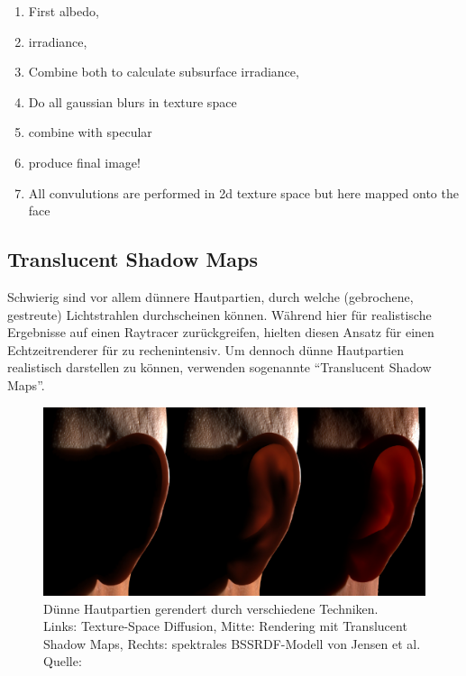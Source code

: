 \documentclass[ngerman,runningheads,a4paper]{llncs}[2018/03/10]
\begin{document}
\begin{enumerate}
  \item First albedo,
  \item irradiance,
  \item Combine both to calculate subsurface irradiance,
  \item Do all gaussian blurs in texture space
  \item combine with specular
  \item produce final image!
  \item All convulutions are performed in 2d texture space but here mapped onto the face
\end{enumerate}

\subsection{Translucent Shadow Maps}
\label{sub:translucent-shadow-maps}

Schwierig sind vor allem dünnere Hautpartien, durch welche (gebrochene, gestreute) Lichtstrahlen durchscheinen können.
Während \citet{realistic-human-face-rendering-matrix} hier für realistische Ergebnisse auf einen Raytracer zurückgreifen, hielten \citet{efficient-human-skin-rendering} diesen Ansatz für einen Echtzeitrenderer für zu rechenintensiv.
Um dennoch dünne Hautpartien realistisch darstellen zu können, verwenden \citet{realistic-human-face-rendering-matrix} sogenannte \enquote{Translucent Shadow Maps}.

\begin{figure}
  \includegraphics[scale=0.2,keepaspectratio]{./images/translucent-shadow-maps.jpg}
  \caption{
    Dünne Hautpartien gerendert durch verschiedene Techniken.\\\hspace{\textwidth}
    Links: Texture-Space Diffusion, Mitte: Rendering mit Translucent Shadow Maps, Rechts: spektrales BSSRDF-Modell von Jensen et al.\\\hspace{\textwidth}Quelle: \citet{efficient-human-skin-rendering}
  }
\end{figure}
\end{document}
